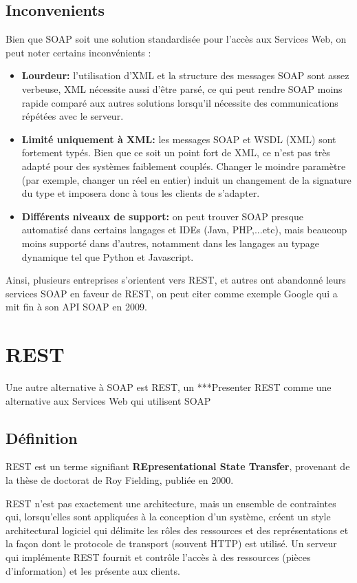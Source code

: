 \subsection{Inconvenients}
Bien que SOAP soit une solution standardisée pour l'accès aux Services Web, on peut noter certains inconvénients :
\begin{itemize}
	\item \textbf{Lourdeur:} l'utilisation d'XML et la structure des messages SOAP sont assez verbeuse, XML nécessite aussi d'être parsé, ce qui peut rendre SOAP moins rapide comparé aux autres solutions lorsqu'il nécessite des communications répétées avec le serveur.
	\item \textbf{Limité uniquement à XML:} les messages SOAP et WSDL (XML) sont fortement typés. Bien que ce soit un point fort de XML, ce n'est pas très adapté pour des systèmes faiblement couplés. Changer le moindre paramètre (par exemple, changer un réel en entier) induit un changement de la signature du type et imposera donc à tous les clients de s'adapter.
	\item \textbf{Différents niveaux de support:} on peut trouver SOAP presque automatisé dans certains langages et IDEs (Java, PHP,...etc), mais beaucoup moins supporté dans d'autres, notamment dans les langages au typage dynamique tel que Python et Javascript.
\end{itemize}
				
Ainsi, plusieurs entreprises s'orientent vers REST, et autres ont abandonné leurs services SOAP en faveur de REST, on peut citer comme exemple Google qui a mit fin à son API SOAP en 2009.
\newpage

\section{REST}
Une autre alternative à SOAP est REST, un
***Presenter REST comme une alternative aux Services Web qui utilisent SOAP
\subsection{Définition}
REST est un terme signifiant \textbf{REpresentational State Transfer}, provenant de la thèse de doctorat de Roy Fielding, publiée en 2000.
				
REST n'est pas exactement une architecture, mais un ensemble de contraintes qui, lorsqu'elles sont appliquées à la conception d'un système, créent un style architectural logiciel qui délimite les rôles des ressources et des représentations et la façon dont le protocole de transport (souvent HTTP) est utilisé. 
Un serveur qui implémente REST fournit et contrôle l'accès à des ressources (pièces d'information) et les présente aux clients.
			

